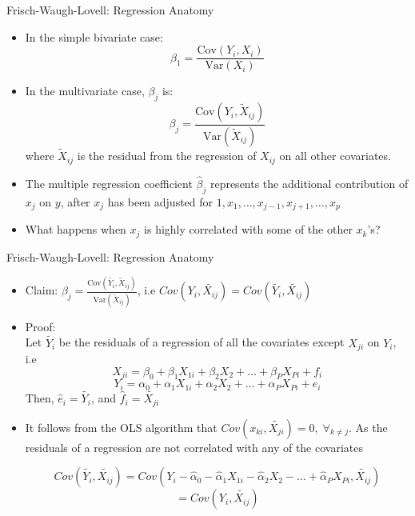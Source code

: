 \documentclass[handout]{beamer}
\begin{document}
\begin{frame}{Frisch-Waugh-Lovell: Regression Anatomy}
\begin{itemize}
\item<+-> In the simple bivariate case:
		 $$\beta_1=\frac{\textrm{Cov}(Y_i,X_i)}{\textrm{Var}(X_i)}$$
 \item<+-> In the multivariate case, $\beta_j$ is:
		$$\beta_j=\frac{\textrm{Cov}(Y_i,\tilde{X}_{ij})}{\textrm{Var}(\tilde{X}_{ij})}$$
where $\tilde{X}_{ij}$ is the residual from the regression of $X_{ij}$ on all other covariates.
\item<+-> The multiple regression coefficient $\hat \beta_j$ represents the additional contribution of $x_j$ on $y$, after $x_j$ has been adjusted for $1, x_1, \dots, x_{j-1}, x_{j+1}, \dots, x_p$ 
\item<+-> What happens when $x_j$ is highly correlated with some of the other $x_k$'s?
\end{itemize}
\end{frame}

\begin{frame}{Frisch-Waugh-Lovell: Regression Anatomy}
\begin{itemize}
\item<+-> Claim: $\beta_j =\frac{\textrm{Cov}(\tilde{Y_i},\tilde{X}_{ij})}{\textrm{Var}(\tilde{X}_{ij})}$, i.e $Cov(Y_i,\tilde{X_{ij}})=
Cov(\tilde{Y_i},\tilde{X_{ij}})$ 
\item<+-> Proof:\\
 Let $\tilde{Y_{i}}$ be the residuals of a regression of all the covariates except $X_{ji}$ on $Y_{i}$, i.e
 \[ X_{ji} = \beta_0 +\beta_1 X_{1i} +\beta_2 X_2+\dots+\beta_P X_{Pi}+f_i\] 
\[ Y_{i} = \alpha_0 +\alpha_1 X_{1i} +\alpha_2 X_2+\dots+\alpha_P X_{Pi}+e_i\] 
Then, $\hat{e}_i = \tilde{Y_{i}}$, and $\hat{f}_i = \tilde{X_{ji}}$
\item<+-> It follows from the OLS algorithm that $Cov(x_{ki},\tilde{X_{ji}})=0,\; \forall_{k\neq j}$. As the residuals of a regression are not correlated with any of the covariates \pause

\[ Cov(\tilde{Y_i},\tilde{X_{ij}}) =  
Cov(Y_i - \hat{\alpha}_0 -\hat{\alpha}_1 X_{1i} -\hat{\alpha}_2 X_2-\dots+\hat{\alpha}_P X_{Pi},\tilde{X_{ij}}) \]
\[ =  Cov(Y_i,\tilde{X_{ij}})\]

\end{itemize}
\end{frame}
\end{document}

